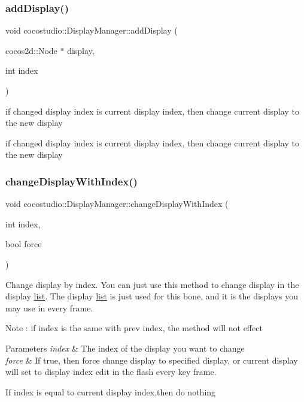 \subsubsection{\texorpdfstring{add\+Display()}{addDisplay()}\hspace{0.1cm}{\footnotesize\ttfamily [3/3]}}
{\footnotesize\ttfamily void cocostudio\+::\+Display\+Manager\+::add\+Display (\begin{DoxyParamCaption}\item[{cocos2d\+::\+Node $\ast$}]{display,  }\item[{int}]{index }\end{DoxyParamCaption})}

if changed display index is current display index, then change current display to the new display

if changed display index is current display index, then change current display to the new display \mbox{\label{classcocostudio_1_1DisplayManager_ab0a8f7711c50c31d0c569c35bc62b4b2}} 
\subsubsection{\texorpdfstring{change\+Display\+With\+Index()}{changeDisplayWithIndex()}\hspace{0.1cm}{\footnotesize\ttfamily [1/2]}}
{\footnotesize\ttfamily void cocostudio\+::\+Display\+Manager\+::change\+Display\+With\+Index (\begin{DoxyParamCaption}\item[{int}]{index,  }\item[{bool}]{force }\end{DoxyParamCaption})}

Change display by index. You can just use this method to change display in the display \hyperlink{protocollist-p}{list}. The display \hyperlink{protocollist-p}{list} is just used for this bone, and it is the displays you may use in every frame.

Note \+: if index is the same with prev index, the method will not effect


\begin{DoxyParams}{Parameters}
{\em index} & The index of the display you want to change \\
\hline
{\em force} & If true, then force change display to specified display, or current display will set to display index edit in the flash every key frame. \\
\hline
\end{DoxyParams}
If index is equal to current display index,then do nothing

